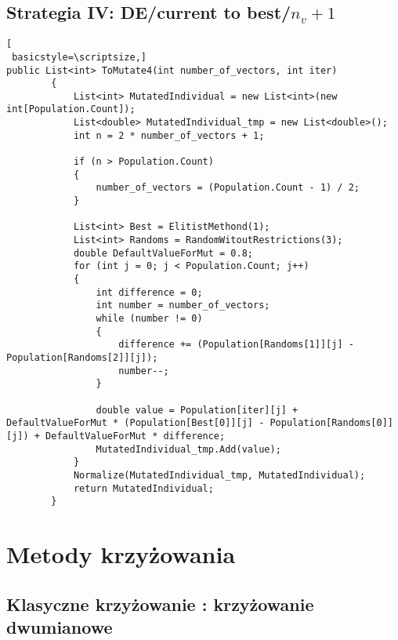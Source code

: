 \subsection*{Strategia IV: DE/current to best/$n_{v} +1$}

\begin{lstlisting}[
 basicstyle=\scriptsize,]
public List<int> ToMutate4(int number_of_vectors, int iter)
        {
            List<int> MutatedIndividual = new List<int>(new int[Population.Count]);
            List<double> MutatedIndividual_tmp = new List<double>();
            int n = 2 * number_of_vectors + 1;

            if (n > Population.Count)
            {
                number_of_vectors = (Population.Count - 1) / 2;
            }

            List<int> Best = ElitistMethond(1);
            List<int> Randoms = RandomWitoutRestrictions(3);
            double DefaultValueForMut = 0.8;
            for (int j = 0; j < Population.Count; j++)
            {
                int difference = 0;
                int number = number_of_vectors;
                while (number != 0)
                {
                    difference += (Population[Randoms[1]][j] - Population[Randoms[2]][j]);
                    number--;
                }

                double value = Population[iter][j] + DefaultValueForMut * (Population[Best[0]][j] - Population[Randoms[0]][j]) + DefaultValueForMut * difference;
                MutatedIndividual_tmp.Add(value);
            }
            Normalize(MutatedIndividual_tmp, MutatedIndividual);
            return MutatedIndividual;
        }
\end{lstlisting}

\section*{Metody krzyżowania}\label{repocross}

\subsection*{Klasyczne krzyżowanie : krzyżowanie dwumianowe}

